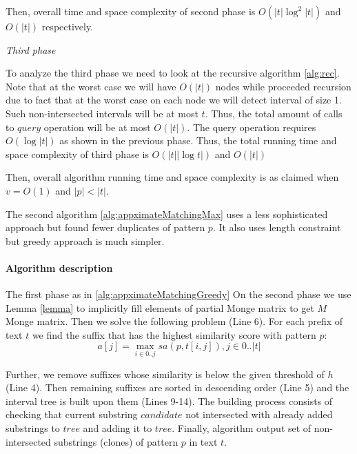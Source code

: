 Then, overall time and space complexity of second phase is 
$O(|t| \log^2 |t|)$ and
$O(|t|)$
respectively.


\emph{Third phase}

To analyze the third phase we need to look at the recursive algorithm \ref{alg:rec}.
Note that at the worst case we will have $O(|t|)$ nodes while proceeded recursion due to fact that at the worst case on each node we will detect interval of size 1.
Such non-intersected intervals will be at most $t$.
Thus, the total amount of calls to $query$ operation will be at most 
$O(|t|)$.
The query operation requires $O(\log |t|)$ as shown in the previous phase.
Thus, the total running time and space complexity of third phase is 
$O(|t| |\log t|)$ and $O(|t|)$  

Then, overall algorithm running time and space complexity is as claimed when $v=O(1)$ and $|p|<|t|$.




The second algorithm \ref{alg:appximateMatchingMax} uses a less sophisticated approach but found fewer duplicates of pattern $p$.
It also uses length constraint but greedy approach
is much simpler.

\paragraph{Algorithm description}

The first phase as in \ref{alg:appximateMatchingGreedy}
On the second phase we use Lemma \ref{lemma} to implicitly fill 
elements of partial Monge matrix to get $M$ Monge matrix.
Then we solve the following problem (Line 6).
For each prefix of text $t$ we find the suffix that has the highest similarity score with pattern $p$:
$$ a[j] = \max _{i \in 0 ..j} sa(p,t[i,j]), j \in 0..|t|$$

Further, we remove suffixes whose similarity is below the given threshold of $h$ (Line 4).
Then remaining suffixes are sorted in descending order (Line 5) and the interval tree is built upon them (Lines 9-14).
The building process consists of checking that current substring $candidate$ not intersected with already added substrings to $tree$ and adding it to $tree$.
Finally, algorithm output set of non-intersected substrings (clones) of pattern $p$ in text $t$.


